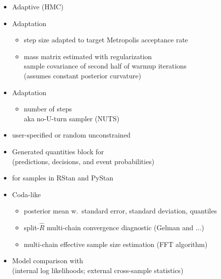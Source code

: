 \documentclass[10pt]{report}
\newcommand{\sld}[1]{\newpage{\noindent\LARGE \ \ \
    \textcolor{MidnightBlue}{\bfseries #1}}\vspace*{4pt}}
\newcommand{\myemph}[1]{{\color{MidnightBlue}{\bfseries #1}}}
\begin{document}
\begin{itemize}
\item Adaptive \myemph{Hamiltonian Monte Carlo} (HMC)
\item Adaptation \myemph{during warmup}
  \vspace*{-4pt}
  \begin{itemize}\small
  \item step size adapted to target Metropolis acceptance rate
  \item mass matrix estimated with regularization
    {\footnotesize
      \\ sample covariance of second half of warmup iterations
      \\ (assumes constant posterior curvature)
    }
  \end{itemize}
\item Adaptation \myemph{during sampling}
  \vspace*{-4pt}
  \begin{itemize}\small
  \item number of steps
    \\
    {\footnotesize aka no-U-turn sampler (NUTS)}
  \end{itemize}
\item \myemph{Initialization} user-specified or random unconstrained
\end{itemize}


\sld{Posterior Inference}

\begin{itemize}
\item Generated quantities block for \myemph{inference}
  \\ {\footnotesize (predictions, decisions, and event probabilities)}
\item \myemph{Extractors} for samples in RStan and PyStan
\item Coda-like \myemph{posterior summary}
  \vspace*{-4pt}
  \begin{itemize}\small
  \item posterior mean w.\ standard error, standard deviation, quantiles
  \item split-$\hat{R}$ multi-chain convergence diagnostic (Gelman and ...)
  \item multi-chain effective sample size estimation (FFT algorithm)
  \end{itemize}
\item Model comparison with \myemph{WAIC}
  \\
  {\footnotesize (internal log likelihoods; external cross-sample statistics)}
\end{itemize}
\end{document}
